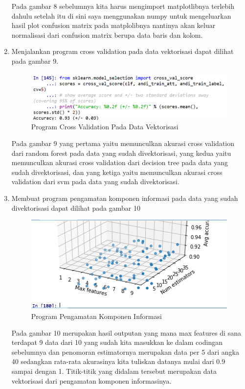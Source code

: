 \begin{enumerate}
\subitem Pada gambar 8 sebelumnya kita harus mengimport matplotlibnya terlebih dahulu setelah itu di sini saya 
 menggunakan numpy untuk mengeluarkan hasil plot confusion matrix pada matplolibnya nantinya akan keluar normalisasi dari  confusion matrix berupa data baris dan kolom. 
\item Menjalankan program cross validation pada data vektorisasi dapat dilihat pada gambar 9.
\begin{figure}[ht]
	\centerline{\includegraphics[width=1\textwidth]{figures/c4P/9.PNG}}
	\caption{Program Cross Validation Pada Data Vektorisasi}
	\label{Contoh Ilustrasi}
\end{figure}

\subitem Pada gambar 9 yang pertama yaitu memunculkan akurasi cross validation dari random forest pada data yang sudah divektorisasi, yang kedua yaitu memunculkan akurasi cross validation dari decision tree pada data yang sudah divektorisasi, dan yang ketiga yaitu memunculkan akurasi cross validation dari svm pada data yang sudah divektorisasi.
\item Membuat program pengamatan komponen informasi pada data yang sudah divektorisasi dapat dilihat pada gambar 10
\begin{figure}[ht]
	\centerline{\includegraphics[width=1\textwidth]{figures/c4P/10.PNG}}
	\caption{Program Pengamatan Komponen Informasi}
	\label{Contoh Ilustrasi}
\end{figure}

\subitem Pada gambar 10  merupakan hasil outputan yang mana max features di sana terdapat 9 data dari 10 yang sudah kita masukkan ke dalam codingan sebelumnya dan penomoran estimatornya merupakan data per 5 dari angka 40 sedangkan rata-rata akurasinya kita tuliskan datanya mulai dari 0.9 sampai dengan 1. Titik-titik yang didalam tersebut merupakan data vektorisasi dari pengamatan komponen informasinya.
\end{enumerate}

